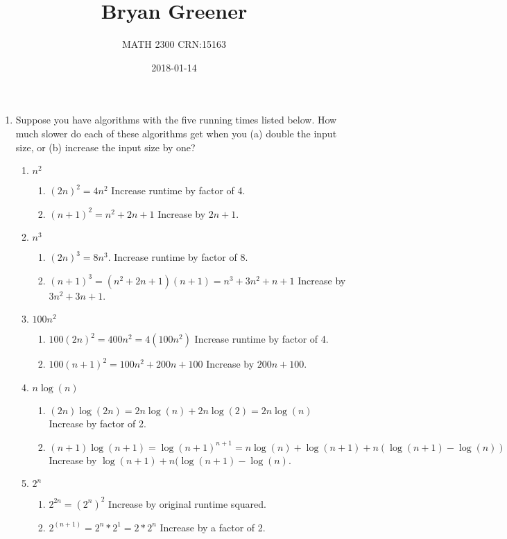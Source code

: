 \documentclass[12pt]{article}
\title{Bryan Greener}
\author{MATH 2300 CRN:15163}
\date{2018-01-14}
\begin{document}
\maketitle

\TabPositions{4cm}

\begin{enumerate}
\item Suppose you have algorithms with the five running times listed below. How much slower do each of these algorithms get when you (a) double the input size, or (b) increase the input size by one?
	\begin{enumerate}
	\item $n^2$
		\begin{enumerate}
		\item $(2n)^2 = 4n^2$ Increase runtime by factor of 4.
		\item $(n+1)^2 = n^2+2n+1$ Increase by $2n+1$.
		\end{enumerate}
	\item $n^3$
		\begin{enumerate}
		\item $(2n)^3 = 8n^3$. Increase runtime by factor of 8.
		\item $(n+1)^3 = (n^2+2n+1)(n+1) = n^3+3n^2+n+1$ Increase by $3n^2+3n+1$.
		\end{enumerate}
	\item $100n^2$
		\begin{enumerate}
		\item $100(2n)^2 = 400n^2 = 4(100n^2)$ Increase runtime by factor of 4.
		\item $100(n+1)^2 = 100n^2+200n+100$ Increase by $200n+100$.
		\end{enumerate}
	\item $n \log(n)$
		\begin{enumerate}
		\item $(2n)\log(2n) = 2n\log(n)+2n\log(2) = 2n\log(n)$ Increase by factor of 2.
		\item $(n+1)\log(n+1) = \log(n+1)^{n+1} = n\log(n)+\log(n+1)+n(\log(n+1)-\log(n))$ Increase by $\log(n+1)+n(\log(n+1)-\log(n)$.
		\end{enumerate}
	\item $2^n$
		\begin{enumerate}
		\item $2^{2n} = (2^n)^2$ Increase by original runtime squared. 
		\item $2^(n+1) = 2^n*2^1 = 2*2^n$ Increase by a factor of 2.

\end{enumerate}
\end{enumerate}
\end{enumerate}
\end{document}

